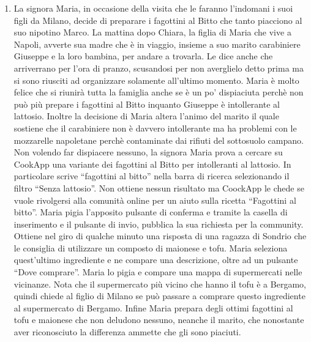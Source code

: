 \begin{enumerate}
\item La signora Maria, in occasione della visita che le faranno
l'indomani i suoi figli da Milano, decide di preparare i fagottini al
Bitto che tanto piacciono al suo nipotino Marco. La mattina dopo Chiara, la
figlia di Maria che vive a Napoli, avverte sua madre che è in viaggio,
insieme a suo marito carabiniere Giuseppe e la loro bambina,
per andare a trovarla. Le dice anche che arriverrano per l'ora di pranzo, scusandosi
per non averglielo detto prima ma si sono
riusciti ad organizzare solamente all'ultimo momento. Maria è molto
felice che si riunirà tutta la famiglia anche se è un po' dispiaciuta
perchè non può più prepare i fagottini al Bitto inquanto Giuseppe è
intollerante al lattosio. Inoltre la decisione di Maria
altera l'animo del marito il quale sostiene che il carabiniere non è
davvero intollerante ma ha problemi con le mozzarelle napoletane perchè
contaminate dai rifiuti del sottosuolo campano. Non volendo far
dispiacere nessuno, la signora Maria prova a cercare su CookApp una
variante dei fagottini al Bitto per intolleranti al lattosio. In
particolare scrive ``fagottini al bitto'' nella barra di ricerca
selezionando il filtro ``Senza lattosio''. Non ottiene nessun risultato
ma CoockApp le chede se vuole rivolgersi alla comunità online per un
aiuto sulla ricetta ``Fagottini al bitto''. Maria pigia l'apposito
pulsante di conferma e tramite la casella di inserimento e il pulsante
di invio, pubblica la sua richiesta per la community. Ottiene nel giro
di qualche minuto una risposta di una ragazza di Sondrio che le
consiglia di utilizzare un composto di maionese e tofu. Maria seleziona
quest'ultimo ingrediente e ne compare una descrizione, oltre ad un
pulsante ``Dove comprare''. Maria lo pigia e compare una mappa di
supermercati nelle vicinanze. Nota che il supermercato più vicino che
hanno il tofu è a Bergamo, quindi chiede al figlio di Milano se può
passare a comprare questo ingrediente al supermercato di Bergamo. Infine
Maria prepara degli ottimi fagottini al tofu e maionese che non deludono
nessuno, neanche il marito, che nonostante aver riconosciuto la
differenza ammette che gli sono piaciuti.

\end{enumerate}
